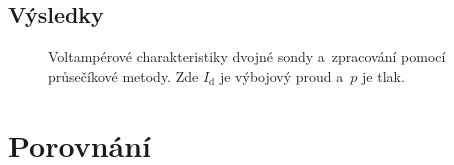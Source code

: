 \documentclass{protokol}
\newcommand\pres{p}
\newcommand\idisch{I_\mathrm{d}}
\begin{document}
\subsection{Výsledky}
\label{sec:results-double}

\begin{figure}
	\centering
	
	
	\par\smallskip
	
	
	\caption{Voltampérové charakteristiky dvojné sondy
		a~zpracování pomocí průsečíkové metody.
		Zde $\idisch$ je výbojový proud a~$\pres$ je tlak.}
	\label{fig:double-vac}
\end{figure}

\section{Porovnání}
\label{sec:comparison}
\end{document}
